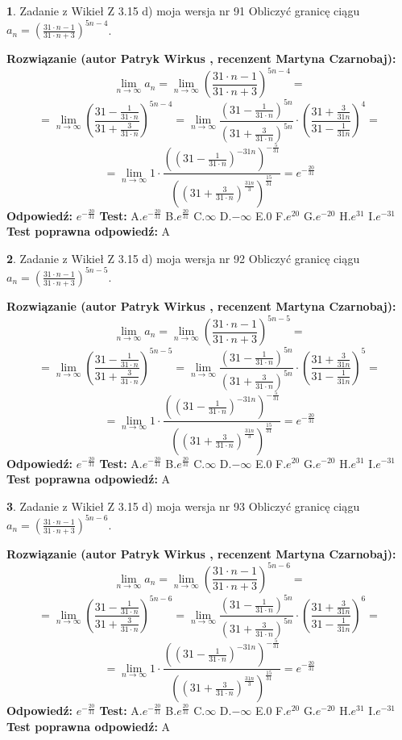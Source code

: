 \documentclass[12pt, a4paper]{article}
\theoremstyle{definition} %
\newtheorem{zad}{}
\newcommand{\zadStart}[1]{\begin{zad}#1\newline}
\newcommand{\zadStop}{\end{zad}}
\newcommand{\rozwStart}[2]{\noindent \textbf{Rozwiązanie (autor #1 , recenzent #2): }\newline}
\newcommand{\rozwStop}{\newline}
\newcommand{\odpStart}{\noindent \textbf{Odpowiedź:}\newline}
\newcommand{\odpStop}{\newline}
\newcommand{\testStart}{\noindent \textbf{Test:}\newline}
\newcommand{\testStop}{\newline}
\newcommand{\kluczStart}{\noindent \textbf{Test poprawna odpowiedź:}\newline}
\newcommand{\kluczStop}{\newline}
\begin{document}
\zadStart{Zadanie z Wikieł Z 3.15 d) moja wersja nr 91}
Obliczyć granicę ciągu $a_{n}=(\frac{31\cdot n - 1}{31 \cdot n + 3})^{5n-4}$.
\zadStop
\rozwStart{Patryk Wirkus}{Martyna Czarnobaj}
$$\lim\limits_{n\to\infty} a_{n} = \lim\limits_{n\to\infty}(\frac{31\cdot n - 1}{31 \cdot n + 3})^{5n-4}=$$
$$=\lim\limits_{n\to\infty}(\frac{31 - \frac{1}{31\cdot n}}{31 + \frac{3}{31 \cdot n}})^{5n-4}=\lim\limits_{n\to\infty}\frac{(31 - \frac{1}{31\cdot n})^{5n}}{(31 + \frac{3}{31\cdot n})^{5n}} \cdot (\frac{31+\frac{3}{31n}}{31-\frac{1}{31n}})^{4}=$$
$$=\lim\limits_{n\to\infty} 1 \cdot \frac{((31-\frac{1}{31 \cdot n})^{-31n})^{-\frac{5}{31}}}{((31+\frac{3}{31 \cdot n})^{\frac{31n}{3}})^{\frac{15}{31}}} =e^{-\frac{20}{31}}$$
\rozwStop
\odpStart
$e^{-\frac{20}{31}}$
\odpStop
\testStart
A.$ e^{-\frac{20}{31}}$
B.$ e^{\frac{20}{31}}$
C.$\infty$
D.$-\infty$
E.$0$
F.$e^{20}$
G.$e^{-20}$
H.$e^{31}$
I.$e^{-31}$
\testStop
\kluczStart
A
\kluczStop



\zadStart{Zadanie z Wikieł Z 3.15 d) moja wersja nr 92}
Obliczyć granicę ciągu $a_{n}=(\frac{31\cdot n - 1}{31 \cdot n + 3})^{5n-5}$.
\zadStop
\rozwStart{Patryk Wirkus}{Martyna Czarnobaj}
$$\lim\limits_{n\to\infty} a_{n} = \lim\limits_{n\to\infty}(\frac{31\cdot n - 1}{31 \cdot n + 3})^{5n-5}=$$
$$=\lim\limits_{n\to\infty}(\frac{31 - \frac{1}{31\cdot n}}{31 + \frac{3}{31 \cdot n}})^{5n-5}=\lim\limits_{n\to\infty}\frac{(31 - \frac{1}{31\cdot n})^{5n}}{(31 + \frac{3}{31\cdot n})^{5n}} \cdot (\frac{31+\frac{3}{31n}}{31-\frac{1}{31n}})^{5}=$$
$$=\lim\limits_{n\to\infty} 1 \cdot \frac{((31-\frac{1}{31 \cdot n})^{-31n})^{-\frac{5}{31}}}{((31+\frac{3}{31 \cdot n})^{\frac{31n}{3}})^{\frac{15}{31}}} =e^{-\frac{20}{31}}$$
\rozwStop
\odpStart
$e^{-\frac{20}{31}}$
\odpStop
\testStart
A.$ e^{-\frac{20}{31}}$
B.$ e^{\frac{20}{31}}$
C.$\infty$
D.$-\infty$
E.$0$
F.$e^{20}$
G.$e^{-20}$
H.$e^{31}$
I.$e^{-31}$
\testStop
\kluczStart
A
\kluczStop



\zadStart{Zadanie z Wikieł Z 3.15 d) moja wersja nr 93}
Obliczyć granicę ciągu $a_{n}=(\frac{31\cdot n - 1}{31 \cdot n + 3})^{5n-6}$.
\zadStop
\rozwStart{Patryk Wirkus}{Martyna Czarnobaj}
$$\lim\limits_{n\to\infty} a_{n} = \lim\limits_{n\to\infty}(\frac{31\cdot n - 1}{31 \cdot n + 3})^{5n-6}=$$
$$=\lim\limits_{n\to\infty}(\frac{31 - \frac{1}{31\cdot n}}{31 + \frac{3}{31 \cdot n}})^{5n-6}=\lim\limits_{n\to\infty}\frac{(31 - \frac{1}{31\cdot n})^{5n}}{(31 + \frac{3}{31\cdot n})^{5n}} \cdot (\frac{31+\frac{3}{31n}}{31-\frac{1}{31n}})^{6}=$$
$$=\lim\limits_{n\to\infty} 1 \cdot \frac{((31-\frac{1}{31 \cdot n})^{-31n})^{-\frac{5}{31}}}{((31+\frac{3}{31 \cdot n})^{\frac{31n}{3}})^{\frac{15}{31}}} =e^{-\frac{20}{31}}$$
\rozwStop
\odpStart
$e^{-\frac{20}{31}}$
\odpStop
\testStart
A.$ e^{-\frac{20}{31}}$
B.$ e^{\frac{20}{31}}$
C.$\infty$
D.$-\infty$
E.$0$
F.$e^{20}$
G.$e^{-20}$
H.$e^{31}$
I.$e^{-31}$
\testStop
\kluczStart
A
\kluczStop
\end{document}
